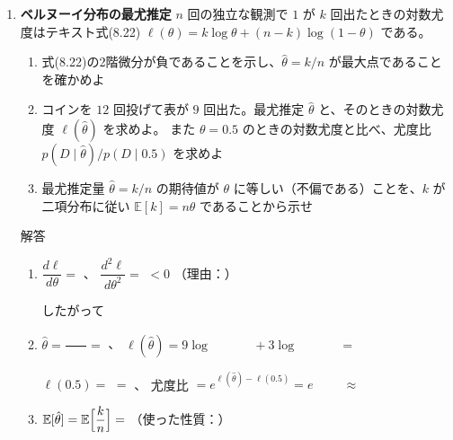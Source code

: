 \documentclass[a4paper,dvipdfmx]{jsarticle}
\newcommand{\提出期限}{2026年11月16日（月）}
\newcommand{\学籍番号}{0000000}
\newcommand{\氏名}{氏名を書く}
\newcommand{\提出日}{2026年11月16日}
\newenvironment{answer}{\begin{itembox}[l]{解答}}{\end{itembox}}
\begin{document}
\begin{enumerate}
\begin{answer}
\begin{enumerate}
          $\theta_{j1} \neq \theta_{j0}$ で $w_j = 0$ になることは ある／ない（　　）。
          \vspace{2mm}

          理由：$w_j = 0 \iff$ \phantom{XXXXXXXXXXXXXXXX}
          \vspace{8mm}
      \end{enumerate}
    \end{answer}

  \item \textbf{ベルヌーイ分布の最尤推定}\quad
    $n$ 回の独立な観測で $1$ が $k$ 回出たときの対数尤度はテキスト式(8.22) $\ell(\theta) = k\log\theta + (n - k)\log(1 - \theta)$ である。
    \begin{enumerate}
      \item 式(8.22)の2階微分が負であることを示し、$\hat{\theta} = k/n$ が最大点であることを確かめよ
      \item コインを $12$ 回投げて表が $9$ 回出た。最尤推定 $\hat{\theta}$ と、そのときの対数尤度 $\ell(\hat{\theta})$ を求めよ。
        また $\theta = 0.5$ のときの対数尤度と比べ、尤度比 $p(D \mid \hat{\theta}) / p(D \mid 0.5)$ を求めよ
      \item 最尤推定量 $\hat{\theta} = k/n$ の期待値が $\theta$ に等しい（不偏である）ことを、$k$ が二項分布に従い $\mathbb{E}[k] = n\theta$ であることから示せ
    \end{enumerate}
    \begin{answer}
      \begin{enumerate}
        \item $\dfrac{d\ell}{d\theta} = $ \phantom{XXXXXXXXXXXX}、\quad
          $\dfrac{d^2\ell}{d\theta^2} = $ \phantom{XXXXXXXXXXXXXXXX} $< 0$ （理由：\phantom{XXXXXXXXXXXXXXXX}）
          \vspace{2mm}

          したがって
          \vspace{8mm}
        \item $\hat{\theta} = \dfrac{\phantom{XX}}{\phantom{XX}} = $ \phantom{XXXX}、\quad
          $\ell(\hat{\theta}) = 9\log\phantom{XXXX} + 3\log\phantom{XXXX} = $ \phantom{XXXXXX}
          \vspace{2mm}

          $\ell(0.5) = $ \phantom{XXXXXXXXXX} $= $ \phantom{XXXXXX}、\quad
          尤度比 $= e^{\ell(\hat{\theta}) - \ell(0.5)} = e^{\phantom{XXXX}} \approx$ \phantom{XXXX}
          \vspace{4mm}
        \item $\mathbb{E}[\hat{\theta}] = \mathbb{E}\Bigl[\dfrac{k}{n}\Bigr] = $ \phantom{XXXXXXXXXXXXXXXX}（使った性質：\phantom{XXXXXXXXXXXX}）
          \vspace{6mm}
      \end{enumerate}
    \end{answer}


\end{enumerate}
\end{document}
